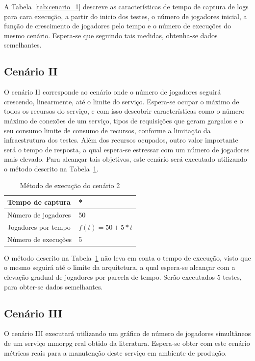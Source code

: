 A Tabela~\ref{tab:cenario_1} descreve as características de tempo de captura de logs para cara execução, a partir do inicio dos testes, o número de jogadores inicial, a função de crescimento de jogadores pelo tempo e o número de execuções do mesmo cenário.
%
Espera-se que seguindo tais medidas, obtenha-se dados semelhantes.


\subsection{Cenário II}

O cenário II corresponde ao cenário onde o número de jogadores seguirá crescendo, linearmente, até o limite do serviço.
%
Espera-se ocupar o máximo de todos os recursos do serviço, e com isso descobrir características como o número máximo de conexões de um serviço, tipos de requisições que geram gargalos e o seu consumo limite de consumo de recursos, conforme a limitação da infraestrutura dos testes.
%
Além dos recursos ocupados, outro valor importante será o tempo de resposta, a qual espera-se estressar com um número de jogadores mais elevado.
%
Para alcançar tais objetivos, este cenário será executado utilizando o método descrito na Tabela~\ref{tab:cenario_2}.

\begin{table}[htb!]
\centering
\caption{Método de execução do cenário 2}
\label{tab:cenario_2}
\begin{tabular}{|l|l|}
\hline
Tempo de captura    &    *              \\ \hline
Número de jogadores & 50                \\ \hline
Jogadores por tempo & $f(t) = 50 + 5*t$ \\ \hline
Número de execuções & 5                 \\ \hline
\end{tabular}
\end{table}

O método descrito na Tabela~\ref{tab:cenario_2} não leva em conta o tempo de execução, visto que o mesmo seguirá até o limite da arquitetura, a qual espera-se alcançar com a elevação gradual de jogadores por parcela de tempo.
%
Serão executados 5 testes, para obter-se dados semelhantes.

\subsection{Cenário III}

O cenário III executará utilizando um gráfico de número de jogadores simultâneos de um serviço \ac{mmorpg} real obtido da literatura.
%
Espera-se obter com este cenário métricas reais para a manutenção deste serviço em ambiente de produção.


